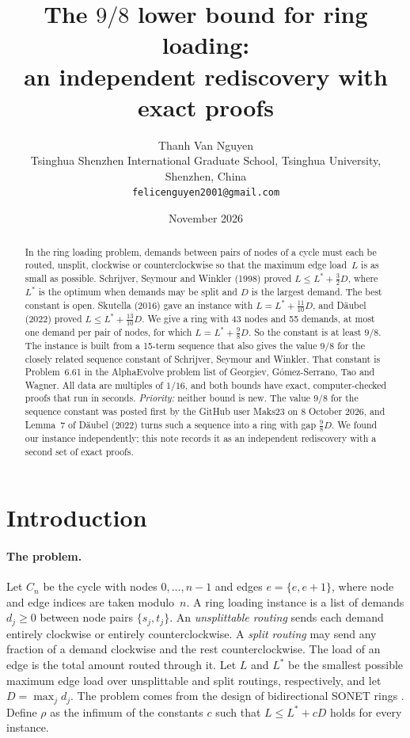 \documentclass[11pt]{article}
\title{The $9/8$ lower bound for ring loading:\\ an independent rediscovery with exact proofs}
\author{Thanh Van Nguyen\\[2pt]
\small Tsinghua Shenzhen International Graduate School, Tsinghua University, Shenzhen, China\\
\small \texttt{felicenguyen2001@gmail.com}}
\date{November 2026}
\theoremstyle{plain}
\theoremstyle{definition}
\theoremstyle{remark}
\begin{document}
\maketitle

\begin{abstract}
In the ring loading problem, demands between pairs of nodes of a cycle must each be routed, unsplit, clockwise or counterclockwise so that the maximum edge load~$L$ is as small as possible.
Schrijver, Seymour and Winkler (1998) proved $L \le L^* + \tfrac32 D$, where $L^*$ is the optimum when demands may be split and $D$ is the largest demand.
The best constant is open. Skutella (2016) gave an instance with $L = L^* + \tfrac{11}{10}D$, and Däubel (2022) proved $L \le L^* + \tfrac{13}{10}D$.
We give a ring with 43 nodes and 55 demands, at most one demand per pair of nodes, for which $L = L^* + \tfrac98 D$. So the constant is at least $9/8$.
The instance is built from a 15-term sequence that also gives the value $9/8$ for the closely related sequence constant of Schrijver, Seymour and Winkler. That constant is Problem~6.61 in the AlphaEvolve problem list of Georgiev, Gómez-Serrano, Tao and Wagner.
All data are multiples of $1/16$, and both bounds have exact, computer-checked proofs that run in seconds.
\emph{Priority:} neither bound is new. The value $9/8$ for the sequence constant was posted first by the GitHub user Maks23 on 8 October 2026, and Lemma~7 of Däubel (2022) turns such a sequence into a ring with gap $\tfrac98 D$. We found our instance independently; this note records it as an independent rediscovery with a second set of exact proofs.
\end{abstract}

\section{Introduction}

\paragraph{The problem.}
Let $C_n$ be the cycle with nodes $0,\dots,n-1$ and edges $e=\{e,e+1\}$, where node and edge indices are taken modulo~$n$.
A ring loading instance is a list of demands $d_j\ge 0$ between node pairs $\{s_j,t_j\}$.
An \emph{unsplittable routing} sends each demand entirely clockwise or entirely counterclockwise.
A \emph{split routing} may send any fraction of a demand clockwise and the rest counterclockwise.
The load of an edge is the total amount routed through it.
Let $L$ and $L^*$ be the smallest possible maximum edge load over unsplittable and split routings, respectively, and let $D=\max_j d_j$.
The problem comes from the design of bidirectional SONET rings \cite{CS94}.
Define $\rho$ as the infimum of the constants $c$ such that $L\le L^*+cD$ holds for every instance.
\end{document}
